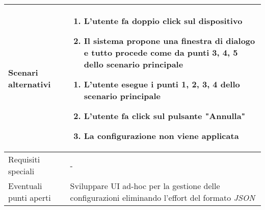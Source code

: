 \documentclass[../../main.tex]{subfiles}
\begin{document}
\begin{tabularx}{150mm}{|l|X|}
    \\
    \hline
    Scenari alternativi                 &    
    \begin{enumerate}
        \item L'utente fa doppio click sul dispositivo
        \item Il sistema propone una finestra di dialogo e tutto procede come da punti 3, 4, 5 dello scenario principale
    \end{enumerate}
    \begin{enumerate}
        \item L'utente esegue i punti 1, 2, 3, 4 dello scenario principale
        \item L'utente fa click sul pulsante "Annulla"
        \item La configurazione non viene applicata
    \end{enumerate}
    \\
    \hline
    Requisiti speciali                  & -   \\
    \hline
    Eventuali punti aperti              &    Sviluppare UI ad-hoc per la gestione delle configurazioni eliminando l'effort del formato \textit{JSON}\\
    \hline
\end{tabularx}
\newpage
\end{document}
